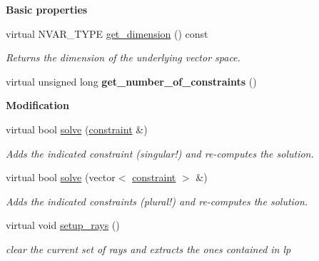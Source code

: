 \begin{Indent}\textbf{ Basic properties}\par
\begin{DoxyCompactItemize}
\item 
\mbox{\label{group___c_l_s_solvers_a40b49fb3bb0b14cc66cabf54ef17e437}} 
virtual N\+V\+A\+R\+\_\+\+T\+Y\+PE \hyperlink{group___c_l_s_solvers_a40b49fb3bb0b14cc66cabf54ef17e437}{get\+\_\+dimension} () const
\begin{DoxyCompactList}\small\item\em Returns the dimension of the underlying vector space. \end{DoxyCompactList}\item 
\mbox{\label{group___c_l_s_solvers_a7d09fe31148950d46219df67719aef3f}} 
virtual unsigned long {\bfseries get\+\_\+number\+\_\+of\+\_\+constraints} ()
\end{DoxyCompactItemize}
\end{Indent}
\begin{Indent}\textbf{ Modification}\par
\begin{DoxyCompactItemize}
\item 
virtual bool \hyperlink{group___c_l_s_solvers_a1ff16def22c734348c626b65437dd1e3}{solve} (\hyperlink{group___c_l_s_solvers_classconstraint}{constraint} \&)
\begin{DoxyCompactList}\small\item\em Adds the indicated constraint (singular!) and re-\/computes the solution. \end{DoxyCompactList}\item 
virtual bool \hyperlink{group___c_l_s_solvers_a5000b8c5bee37029276ce63a3568bfb7}{solve} (vector$<$ \hyperlink{group___c_l_s_solvers_classconstraint}{constraint} $>$ \&)
\begin{DoxyCompactList}\small\item\em Adds the indicated constraints (plural!) and re-\/computes the solution. \end{DoxyCompactList}\item 
\mbox{\label{group___c_l_s_solvers_a00076ee1e8ef90f7d162f02372529666}} 
virtual void \hyperlink{group___c_l_s_solvers_a00076ee1e8ef90f7d162f02372529666}{setup\+\_\+rays} ()
\begin{DoxyCompactList}\small\item\em clear the current set of rays and extracts the ones contained in lp \end{DoxyCompactList}\end{DoxyCompactItemize}
\end{Indent}
